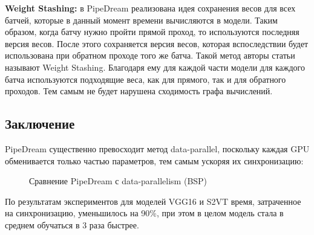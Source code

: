 \textbf{Weight Stashing:} в PipeDream реализована идея сохранения весов для всех батчей, которые в данный момент времени вычисляются в модели. Таким образом, когда батчу нужно пройти прямой проход, то используются последняя версия весов. После этого сохраняется версия весов, которая вспоследствии будет использована при обратном проходе того же батча. Такой метод авторы статьи называют Weight Stashing. Благодаря ему для каждой части модели для каждого батча используются подходящие веса, как для прямого, так и для обратного проходов. Тем самым не будет нарушена сходимость графа вычислений.

\subsection{Заключение}
PipeDream существенно превосходит метод data-parallel, поскольку каждая GPU обменивается только частью параметров, тем самым ускоряя их синхронизацию:

\begin{figure}[h]%
	\centering
	\caption{Сравнение PipeDream с data-parallelism (BSP)}
	\label{framework} %
\end{figure}

По результатам экспериментов для моделей VGG16 и S2VT время, затраченное на синхронизацию, уменьшилось на 90\%, при этом в целом модель стала в среднем обучаться в 3 раза быстрее.